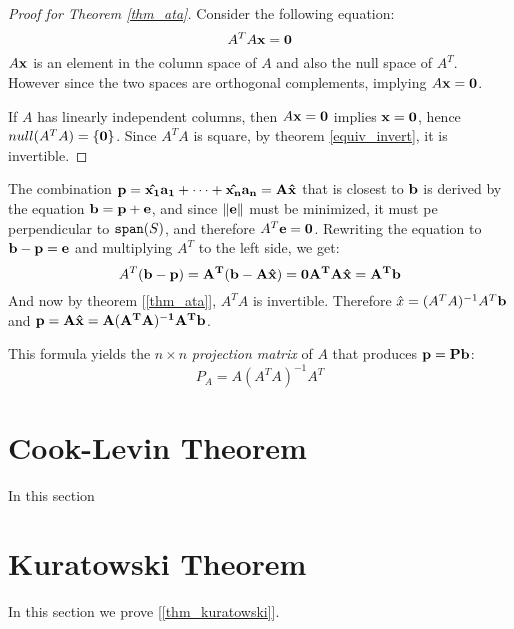    	\begin{proof}[Proof for Theorem \ref{thm_ata}]
    		Consider the following equation:
    		\begin{displaymath}
	    		A^TA\bf{x}=\bf{0}
    		\end{displaymath}
    		$A\bf{x}$ is an element in the column space of $A$ and also the null space of $A^T$. However since the two spaces are orthogonal complements, implying $A\bf{x}=\bf{0}$.
    		
    		If $A$ has linearly independent columns, then $A\bf{x}=\bf{0}$ implies $\bf{x}=\bf{0}$, hence $null(A^TA)=\{\bf{0}\}$. Since $A^TA$ is square, by theorem \ref{equiv_invert}, it is invertible.
    	\end{proof}
    	
    	The combination $\bf{p}=\hat{x_1}\bf{a_1}+\dots+\hat{x_n}\bf{a_n}=A\hat{x}$ that is closest to $\bf{b}$ is derived by the equation $\bf{b}=\bf{p}+\bf{e}$, and since $\|\bf{e}\|$ must be minimized, it must pe perpendicular to $\verb|span|(S)$, and therefore $A^T\bf{e}=\bf{0}$. Rewriting the equation to $\bf{b}-\bf{p}=\bf{e}$ and multiplying $A^T$ to the left side, we get:
    	\begin{displaymath}
	    	A^T(\bf{b}-\bf{p})=A^T(\bf{b}-A\hat{x})=\bf{0} \\ A^TA\hat{x}=A^T\bf{b}
    	\end{displaymath}
    	And now by theorem [\ref{thm_ata}], $A^TA$ is invertible. Therefore $\hat{x}=(A^TA)^{-1}A^T\bf{b}$ and $\bf{p}=A\hat{x}=A(A^TA)^{-1}A^T\bf{b}$.
    	
    	This formula yields the $n \times n$ \emph{projection matrix} of $A$ that produces $\bf{p}=P\bf{b}$:
    	\begin{displaymath}
	    	P_A=A(A^TA)^{-1}A^T
    	\end{displaymath}
    	
        
    \section{Cook-Levin Theorem}
        In this section
    
    \section{Kuratowski Theorem}
        In this section we prove [\ref{thm_kuratowski}].
        
    
